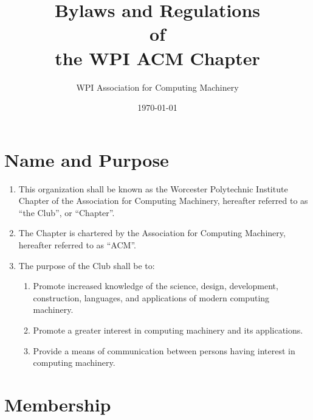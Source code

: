 \documentclass[12pt, letterpaper, oneside]{book}
\title{Bylaws and Regulations \\ of \\ the WPI ACM Chapter}
\author{WPI Association for Computing Machinery}
\date{\today}
\begin{document}
\maketitle

\tableofcontents
\newpage

\renewcommand{\chaptername}{Article}

\chapter{Name and Purpose}
\begin{enumerate}
    \item This organization shall be known as the Worcester Polytechnic
        Institute Chapter of the Association for Computing Machinery, hereafter
        referred to as ``the Club'', or ``Chapter''.
    \item The Chapter is chartered by the Association for Computing Machinery,
        hereafter referred to as ``ACM''.
    \item The purpose of the Club shall be to:
        \begin{enumerate}
            \item Promote increased knowledge of the science, design,
                development, construction, languages, and applications of modern
                computing machinery.
            \item Promote a greater interest in computing machinery and its
                applications.
            \item Provide a means of communication between persons having
                interest in computing machinery.
        \end{enumerate}
\end{enumerate}

\chapter{Membership}
\end{document}
